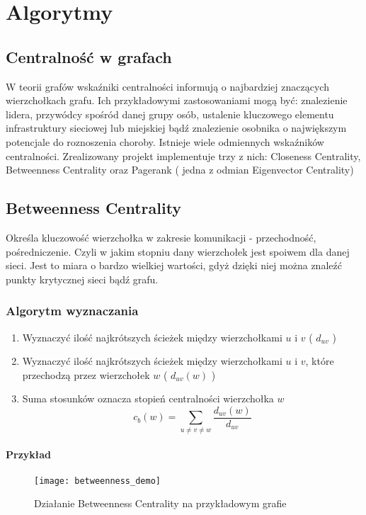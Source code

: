 \chapter{Algorytmy}

\section{Centralność w grafach}

W teorii grafów wskaźniki centralności informują o najbardziej znaczących wierzchołkach grafu. Ich przykładowymi zastosowaniami mogą być: znalezienie lidera, przywódcy spośród danej grupy osób, ustalenie kluczowego elementu infrastruktury sieciowej lub miejskiej bądź znalezienie osobnika o największym potencjale do roznoszenia choroby. Istnieje wiele odmiennych wskaźników centralności. Zrealizowany projekt implementuje trzy z nich: Closeness Centrality, Betweenness Centrality oraz Pagerank ( jedna z odmian Eigenvector Centrality)



\section{Betweenness Centrality}

Określa kluczowość wierzchołka w zakresie komunikacji - przechodność, pośredniczenie. Czyli w jakim stopniu dany wierzchołek jest spoiwem dla danej sieci. Jest to miara o bardzo wielkiej wartości, gdyż dzięki niej można znaleźć punkty krytycznej sieci bądź grafu.

\subsection{Algorytm wyznaczania}
\begin{enumerate}
\item Wyznaczyć ilość najkrótszych ścieżek między wierzchołkami $u$ i $v$ ( $d_{uv}$ )
\item Wyznaczyć ilość najkrótszych ścieżek między wierzchołkami $u$ i $v$, które przechodzą przez wierzchołek $w$ ( $d_{uv}(w)$ )
\item Suma stosunków  oznacza stopień centralności wierzchołka $w$ $$c_b(w) = \sum_{u \neq v \neq w} \frac{d_{uv}(w)}{d_{uv}}$$
\end{enumerate}

\newpage
\FloatBarrier
\subsubsection{Przykład}
\begin{figure}[h]
\centering
\texttt{[image: betweenness\_demo]}
\caption{Działanie Betweenness Centrality  na przykładowym grafie}
\end{figure}
\FloatBarrier


